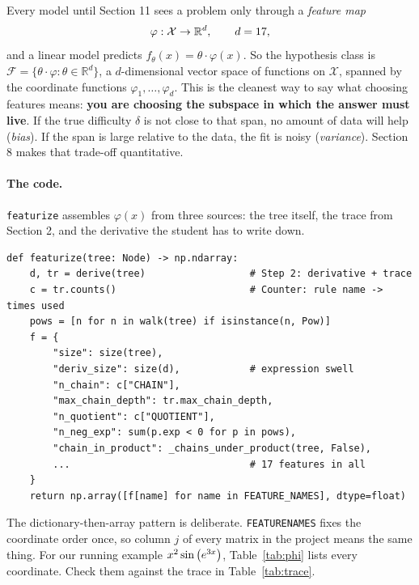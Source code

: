 \documentclass[11pt]{article}
\theoremstyle{definition}
\theoremstyle{plain}
\theoremstyle{remark}
\newcommand{\R}{\mathbb{R}}
\newcommand{\X}{\mathcal{X}}
\newcommand{\code}[1]{\texttt{#1}}
\renewcommand{\_}{\oldunderscore\allowbreak}
\newcommand{\file}[1]{\textcolor{blue!50!black}{\texttt{#1}}}
\newcommand{\codefrom}[1]{\par\smallskip\noindent{\footnotesize\textbf{From} \file{#1}}}
\begin{document}
Every model until Section 11 sees a problem only through a \emph{feature map}
\[
  \varphi:\X\to\R^d,\qquad d=\FNFeatures,
\]
and a linear model predicts $f_\theta(x)=\theta\cdot\varphi(x)$. So the hypothesis class is
$\mathcal F=\{\theta\cdot\varphi:\theta\in\R^d\}$, a $d$-dimensional vector space of functions on $\X$,
spanned by the coordinate functions $\varphi_1,\dots,\varphi_d$. This is the cleanest way to say what
choosing features means: \textbf{you are choosing the subspace in which the answer must live}.
If the true difficulty $\delta$ is not close to that span, no amount of data will help (\emph{bias}).
If the span is large relative to the data, the fit is noisy (\emph{variance}). Section 8 makes that trade-off quantitative.

\paragraph{The code.} \code{featurize} assembles $\varphi(x)$ from three sources: the tree itself, the
trace from Section 2, and the derivative the student has to write down.

\codefrom{src/calcdiff/features.py}
\begin{lstlisting}
def featurize(tree: Node) -> np.ndarray:
    d, tr = derive(tree)                  # Step 2: derivative + trace
    c = tr.counts()                       # Counter: rule name -> times used
    pows = [n for n in walk(tree) if isinstance(n, Pow)]
    f = {
        "size": size(tree),
        "deriv_size": size(d),            # expression swell
        "n_chain": c["CHAIN"],
        "max_chain_depth": tr.max_chain_depth,
        "n_quotient": c["QUOTIENT"],
        "n_neg_exp": sum(p.exp < 0 for p in pows),
        "chain_in_product": _chains_under_product(tree, False),
        ...                               # 17 features in all
    }
    return np.array([f[name] for name in FEATURE_NAMES], dtype=float)
\end{lstlisting}
The dictionary-then-array pattern is deliberate. \code{FEATURE\_NAMES} fixes the coordinate order once,
so column $j$ of every matrix in the project means the same thing. For our running example
$x^{2} \sin\left(e^{3 x}\right)$, Table~\ref{tab:phi} lists every coordinate. Check them against the trace in Table~\ref{tab:trace}.

\begin{table}[h]\centering\footnotesize

\caption{$\varphi(x)$ for $x=\TExProblem$.}\label{tab:phi}
\end{table}
\end{document}

